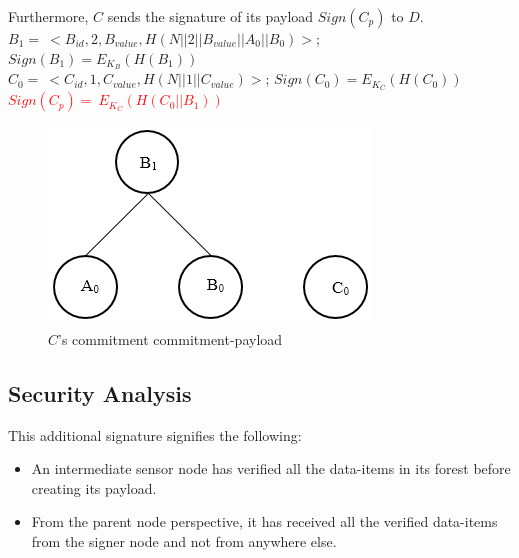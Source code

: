 		Furthermore, $C$ sends the signature of its payload $Sign(C_{p})$ to $D$.\\
		$B_{1} =\ <B_{id}, 2, B_{value}, H(N||2||B_{value}||A_{0}||B_{0})>$; $Sign(B_{1}) = E_{K_{B}}(H(B_{1}))$\\
		$C_{0} =\ <C_{id}, 1, C_{value}, H(N||1||C_{value})>$; $Sign(C_{0}) = E_{K_{C}}(H(C_{0}))$\\
		\textcolor{red}{$Sign(C_{p}) =\	E_{K_{C}}(H(C_{0} || B_{1}))$}
			\begin{figure}[h!]
				\centering
				\includegraphics[scale = 0.5]{images/commitment-payload-of-C.png}
				\caption{$C$'s commitment commitment-payload}
				\label{fig:Commitment payload of C}
			\end{figure}
	\subsection{Security Analysis}

	This additional signature signifies the following:
	\begin{itemize}
		\item	An intermediate sensor node has verified all the data-items in its forest before creating its payload.
		\item From the parent node perspective, it has received all the verified data-items from the signer node and not from anywhere else.
	\end{itemize}

